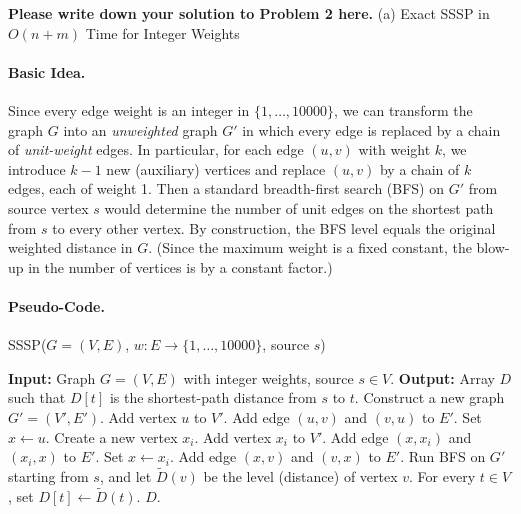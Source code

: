 \documentclass[letterpaper, 11pt]{article}
\newcommand{\1}{\mathds{1}}	%
\theoremstyle{definition}
\newenvironment{solution}{{\par\noindent\it Solution.}}{}
\begin{document}
\begin{solution}
\textbf{Please write down your solution to Problem 2 here.}
\clearpage
(a) Exact SSSP in $O(n+m)$ Time for Integer Weights

\paragraph{Basic Idea.}
Since every edge weight is an integer in $\{1,\dots, 10000\}$, we can transform the graph $G$ into an \emph{unweighted} graph $G'$ in which every edge is replaced by a chain of \emph{unit-weight} edges. In particular, for each edge $(u,v)$ with weight $k$, we introduce $k-1$ new (auxiliary) vertices and replace $(u,v)$ by a chain of $k$ edges, each of weight 1. Then a standard breadth-first search (BFS) on $G'$ from source vertex $s$ would determine the number of unit edges on the shortest path from $s$ to every other vertex. By construction, the BFS level equals the original weighted distance in $G$. (Since the maximum weight is a fixed constant, the blow-up in the number of vertices is by a constant factor.)

\paragraph{Pseudo-Code.}
\begin{algorithm}
\caption{SSSP($G=(V,E)$, $w: E \to \{1,\dots,10000\}$, source $s$)}
\begin{algorithmic}[1]
\State \textbf{Input:} Graph $G=(V,E)$ with integer weights, source $s\in V$.
\State \textbf{Output:} Array $D$ such that $D[t]$ is the shortest-path distance from $s$ to $t$.
\medskip
\State Construct a new graph $G'=(V',E')$.
    \State Add vertex $u$ to $V'$.
\EndFor
{}
        \State Add edge $(u,v)$ and $(v,u)$ to $E'$.
    \Else
        \State Set $x\gets u$.
            \State Create a new vertex $x_i$.
            \State Add vertex $x_i$ to $V'$.
            \State Add edge $(x,x_i)$ and $(x_i,x)$ to $E'$.
            \State Set $x\gets x_i$.
        \EndFor
        \State Add edge $(x,v)$ and $(v,x)$ to $E'$.
    \EndIf
\EndFor
\medskip
\State Run BFS on $G'$ starting from $s$, and let $\widetilde{D}(v)$ be the level (distance) of vertex $v$.
\medskip
\State For every $t\in V$, set $D[t] \gets \widetilde{D}(t)$.
\State \Return $D$.
\end{algorithmic}
\end{algorithm}


\end{solution}
\end{document}
